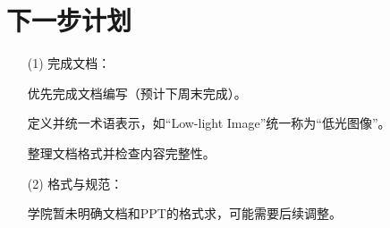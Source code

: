 \documentclass[a4paper, 10pt]{article}
\begin{document}
	\section{下一步计划}
	
		\begin{itemize}
			\item [(1)] 完成文档：
				
				\item [\checkmark] 优先完成文档编写（预计下周末完成）。
				
				\item [\checkmark] 定义并统一术语表示，如“Low-light Image”统一称为“低光图像”。
				
				\item [\checkmark] 整理文档格式并检查内容完整性。
				
			\item [(2)] 格式与规范：
			
				\item [\checkmark] 学院暂未明确文档和PPT的格式求，可能需要后续调整。
		\end{itemize}
	
%	
%	
	
	
\end{document}
